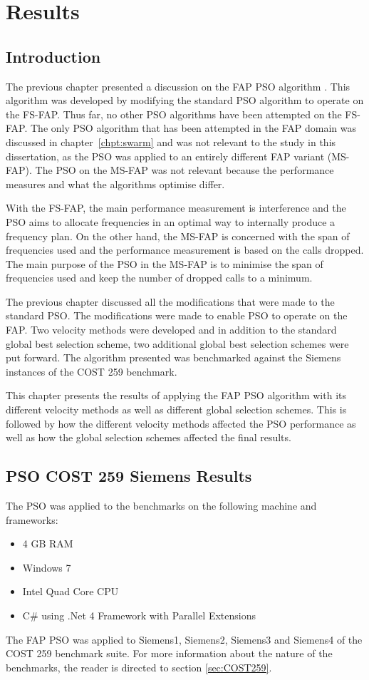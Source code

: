 \chapter{Results}
\label{chpt:results}
\section{Introduction}
The previous chapter presented a discussion on the FAP PSO algorithm . This algorithm was developed by modifying the standard PSO algorithm to operate on the FS-FAP. Thus far, no other PSO algorithms have been attempted on the FS-FAP. The only PSO algorithm that has been attempted in the FAP domain was discussed in chapter~\ref{chpt:swarm} and was not relevant to the study in this dissertation, as the PSO was applied to an entirely different FAP variant (MS-FAP). The PSO on the MS-FAP was not relevant because the performance measures and what the algorithms optimise differ.

With the FS-FAP, the main performance measurement is interference and the PSO aims to allocate frequencies in an optimal way to internally produce a frequency plan. On the other hand, the MS-FAP is concerned with the span of frequencies used and the performance measurement is based on the calls dropped. The main purpose of the PSO in the MS-FAP is to minimise the span of frequencies used and keep the number of dropped calls to a minimum.

The previous chapter discussed all the modifications that were made to the standard PSO. The modifications were made to enable PSO to operate on the FAP. Two velocity methods were developed and in addition to the standard global best selection scheme, two additional global best selection schemes were put forward. The algorithm presented was benchmarked against the Siemens instances of the COST 259 benchmark.

This chapter presents the results of applying the FAP PSO algorithm with its different velocity methods as well as different global selection schemes. This is followed by how the different velocity methods affected the PSO performance as well as how the global selection schemes affected the final results.

\section{PSO COST 259 Siemens Results}
The PSO was applied to the benchmarks on the following machine and frameworks:
\begin{itemize}
\item 4 GB RAM
\item Windows 7
\item Intel Quad Core CPU
\item C\# using .Net 4 Framework with Parallel Extensions
\end{itemize}
The FAP PSO was applied to Siemens1, Siemens2, Siemens3 and Siemens4 of the COST 259 benchmark suite. For more information about the nature of the benchmarks, the reader is directed to section \ref{sec:COST259}.

